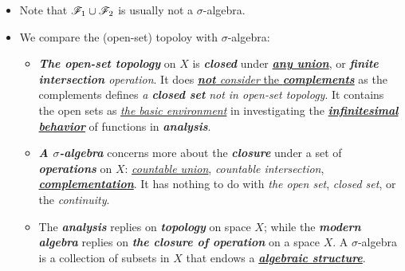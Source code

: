 \documentclass[11pt]{article}
\begin{document}
\begin{itemize}
\begin{example}
\end{example}

\item \begin{remark}
 Note that ${\mathscr F}_{1}\cup {\mathscr F}_{2}$ is usually not a $\sigma$-algebra.
 \end{remark}
 
 
\item \begin{remark} We compare the (open-set) topoloy with $\sigma$-algebra: 
\begin{itemize}
\item  \emph{\textbf{The open-set topology}} on $X$ is \emph{\textbf{closed}} under \underline{\emph{\textbf{any union}}}, or \emph{\textbf{finite intersection} operation}. It does \underline{\emph{\textbf{not} consider} the \emph{\textbf{complements}}} as the complements defines \emph{a \textbf{closed set}} \emph{not in open-set topology}. It contains the open sets as \underline{\emph{the basic environment}} in investigating the \underline{\emph{\textbf{infinitesimal behavior}}} of functions in \emph{\textbf{analysis}}. 

\item \emph{\textbf{A $\sigma$-algebra}} concerns more about the \emph{\textbf{closure}} under a set of \emph{\textbf{operations}} on $X$: \underline{\emph{countable union}}, \emph{countable intersection}, \underline{\emph{\textbf{complementation}}}. It has nothing to do with \emph{the open set}, \emph{closed set}, or the \emph{continuity}.

\item The \emph{\textbf{analysis}} replies on \emph{\textbf{topology}} on space $X$; while the \emph{\textbf{modern algebra}} replies on \emph{\textbf{the closure of operation}} on a space $X$.  A $\sigma$-algebra is a collection of subsets in $X$ that endows a \underline{\emph{\textbf{algebraic structure}}}.   
\end{itemize}
\end{remark} 
\end{itemize}
\end{document}
